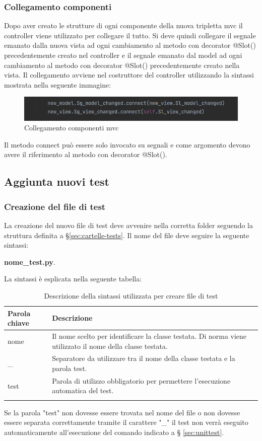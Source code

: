 \subsubsection{Collegamento componenti}
Dopo aver creato le strutture di ogni componente della nuova tripletta mvc il controller viene utilizzato per collegare il tutto. 
Si deve quindi collegare il segnale emanato dalla nuova vista ad ogni cambiamento al metodo con decorator @Slot() precedentemente creato nel controller e il segnale emanato dal model ad ogni cambiamento al metodo con decorator @Slot() precedentemente creato nella vista. Il collegamento avviene nel costruttore del controller utilizzando la sintassi mostrata nella seguente immagine:
\begin{figure}[H]
    \centering
    \includegraphics[scale = 0.50]{components/img/collegamento-segnali-mvc.png}
    \caption{Collegamento componenti mvc}
    \label{fig:Collegamento componenti mvc}
\end{figure}
Il metodo connect può essere solo invocato su segnali e come argomento devono avere il riferimento al metodo con decorator @Slot().

\subsection{Aggiunta nuovi test}
\subsubsection{Creazione del file di test}
La creazione del nuovo file di test deve avvenire nella corretta folder seguendo la struttura definita a \S{}\ref{sec:cartelle-tests}. Il nome del file deve seguire la seguente sintassi: \newline{} \centerline{\textbf{nome\_test.py}.} La sintassi è esplicata nella seguente tabella:
{
	\setlength{\freewidth}{\dimexpr\textwidth-1\tabcolsep}
	\renewcommand{\arraystretch}{1.5}
	\setlength{\aboverulesep}{0pt}
	\setlength{\belowrulesep}{0pt}
	\begin{longtable}{L{.15\freewidth} L{.85\freewidth}}
		\textbf{Parola chiave} & \textbf{Descrizione}\\
		\toprule
		\endhead	
		nome & Il nome scelto per identificare la classe testata. Di norma viene utilizzato il nome della classe testata.\\
		\_ & Separatore da utilizzare tra il nome della classe testata e la parola test.\\
		test & Parola di utilizzo obbligatorio per permettere l'esecuzione automatica del test. \\
		\bottomrule
		\hiderowcolors
		\caption{Descrizione della sintassi utilizzata per creare file di test}
	\end{longtable}
}
Se la parola "test" non dovesse essere trovata nel nome del file o non dovesse essere separata correttamente tramite il carattere "\_" il test non verrà eseguito automaticamente all'esecuzione del comando indicato a \S{} \ref{sec:unittest}.
